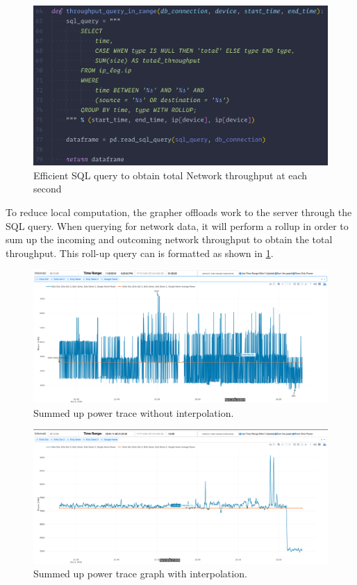 \begin{figure}[H]
    \centering
    \includegraphics[width=1\textwidth]{figures/rollup.png}
    \caption{Efficient SQL query to obtain total Network throughput at each second}
    \label{fig:rollup}
\end{figure}

To reduce local computation, the grapher offloads work to the server through the SQL query. When querying for network data, it will perform a rollup in order to sum up the incoming and outcoming network throughput to obtain the total throughput. This roll-up query can is formatted as shown in \ref{fig:rollup}.

\begin{figure}[H]
    \centering
    \includegraphics[width=1\textwidth]{figures/noninterpolated.png}
    \caption{Summed up power trace without interpolation.}
    \label{fig:noninterpolated}
\end{figure}

\begin{figure}[H]
    \centering
    \includegraphics[width=1\textwidth]{figures/interpolated.png}
    \caption{Summed up power trace graph with interpolation.}
    \label{fig:interpolated}
\end{figure}


